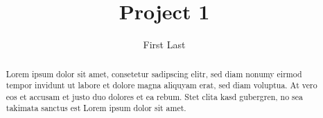 \documentclass[a4paper,titlepage]{article}
\begin{document}
\title{Project 1}
\author{First Last}
\maketitle

\begin{abstract}

	Lorem ipsum dolor sit amet, consetetur sadipscing elitr, sed diam nonumy eirmod
	tempor invidunt ut labore et dolore magna aliquyam erat, sed diam voluptua. At
	vero eos et accusam et justo duo dolores et ea rebum. Stet clita kasd gubergren,
	no sea takimata sanctus est Lorem ipsum dolor sit amet.

\end{abstract}

\tableofcontents
\listoftables
\listoffigures

\pagebreak



%
\end{document}
